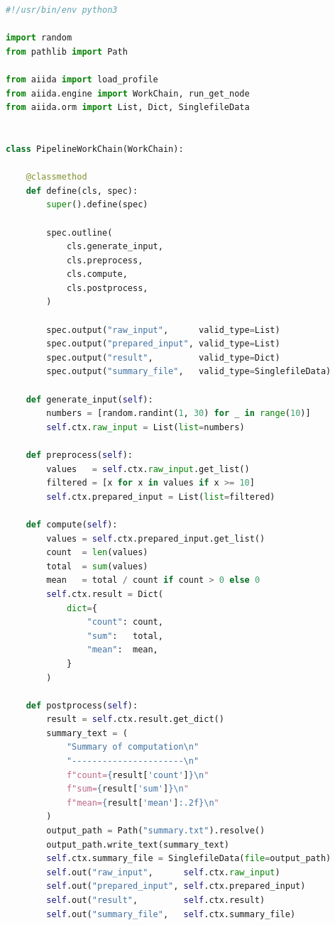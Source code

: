 \begin{lstlisting}[language=Python,
                   caption={pipeline\_workchain.py: Vollständige WorkChain-Implementierung (AiiDA)},
                   label={lst:app:aiida:workchain}]
#!/usr/bin/env python3

import random
from pathlib import Path

from aiida import load_profile
from aiida.engine import WorkChain, run_get_node
from aiida.orm import List, Dict, SinglefileData


class PipelineWorkChain(WorkChain):

    @classmethod
    def define(cls, spec):
        super().define(spec)

        spec.outline(
            cls.generate_input,
            cls.preprocess,
            cls.compute,
            cls.postprocess,
        )

        spec.output("raw_input",      valid_type=List)
        spec.output("prepared_input", valid_type=List)
        spec.output("result",         valid_type=Dict)
        spec.output("summary_file",   valid_type=SinglefileData)

    def generate_input(self):
        numbers = [random.randint(1, 30) for _ in range(10)]
        self.ctx.raw_input = List(list=numbers)

    def preprocess(self):
        values   = self.ctx.raw_input.get_list()
        filtered = [x for x in values if x >= 10]
        self.ctx.prepared_input = List(list=filtered)

    def compute(self):
        values = self.ctx.prepared_input.get_list()
        count  = len(values)
        total  = sum(values)
        mean   = total / count if count > 0 else 0
        self.ctx.result = Dict(
            dict={
                "count": count,
                "sum":   total,
                "mean":  mean,
            }
        )

    def postprocess(self):
        result = self.ctx.result.get_dict()
        summary_text = (
            "Summary of computation\n"
            "----------------------\n"
            f"count={result['count']}\n"
            f"sum={result['sum']}\n"
            f"mean={result['mean']:.2f}\n"
        )
        output_path = Path("summary.txt").resolve()
        output_path.write_text(summary_text)
        self.ctx.summary_file = SinglefileData(file=output_path)
        self.out("raw_input",      self.ctx.raw_input)
        self.out("prepared_input", self.ctx.prepared_input)
        self.out("result",         self.ctx.result)
        self.out("summary_file",   self.ctx.summary_file)



\end{lstlisting}
